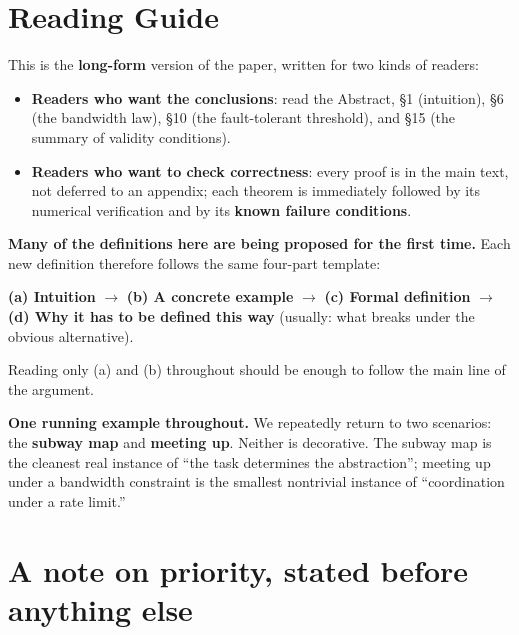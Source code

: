 \documentclass[11pt]{article}
\providecommand{\tightlist}{%
  \setlength{\itemsep}{0pt}\setlength{\parskip}{0pt}}
\renewenvironment{quote}
  {\def\FrameCommand{{\color{gray!60}\vrule width 2pt}\hspace{8pt}}%
   \MakeFramed{\advance\hsize-\width \FrameRestore}\begin{itshape}}
  {\end{itshape}\endMakeFramed}
\begin{document}
\hypertarget{reading-guide}{%
\section*{Reading Guide}\label{reading-guide}}

This is the \textbf{long-form} version of the paper, written for two kinds of readers:

\begin{itemize}
\tightlist
\item
  \textbf{Readers who want the conclusions}: read the Abstract, \S{}1 (intuition), \S{}6 (the bandwidth law), \S{}10 (the fault-tolerant threshold), and \S{}15 (the summary of validity conditions).
\item
  \textbf{Readers who want to check correctness}: every proof is in the main text, not deferred to an appendix; each theorem is immediately followed by its numerical verification and by its \textbf{known failure conditions}.
\end{itemize}

\textbf{Many of the definitions here are being proposed for the first time.} Each new definition therefore follows the same four-part template:

\begin{quote}
\textbf{(a) Intuition} \(\rightarrow\) \textbf{(b) A concrete example} \(\rightarrow\) \textbf{(c) Formal definition} \(\rightarrow\) \textbf{(d) Why it has to be defined this way} (usually: what breaks under the obvious alternative).
\end{quote}

Reading only (a) and (b) throughout should be enough to follow the main line of the argument.

\textbf{One running example throughout.} We repeatedly return to two scenarios: the \textbf{subway map} and \textbf{meeting up}. Neither is decorative. The subway map is the cleanest real instance of ``the task determines the abstraction''; meeting up under a bandwidth constraint is the smallest nontrivial instance of ``coordination under a rate limit.''

\hypertarget{a-note-on-priority-stated-before-anything-else}{%
\section*{A note on priority, stated before anything else}\label{a-note-on-priority-stated-before-anything-else}}
\end{document}
